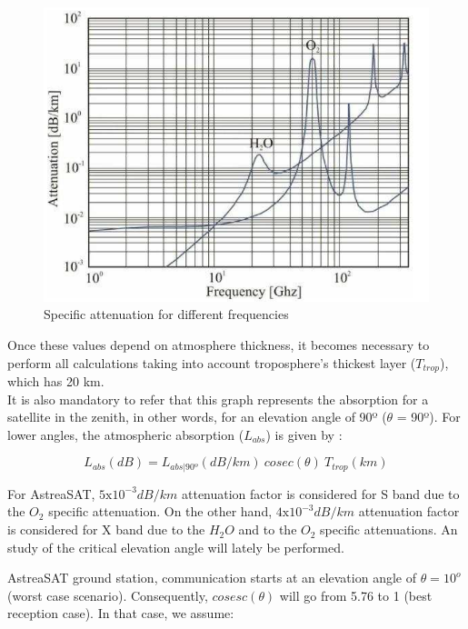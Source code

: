 \begin{figure}[H]
	\includegraphics[scale=0.7]{./sections/SatelliteDept/sections/images/specificAttenuation}
	\centering
	\caption{Specific attenuation for different frequencies \cite{Jorge2012}}
	\label{specificAtenuattion}
\end{figure}

Once these values depend on atmosphere thickness, it becomes necessary to perform all calculations taking into  account troposphere’s thickest layer ($T_{trop}$), which has 20 km.\\ It is also mandatory to refer that this graph represents the absorption for a satellite in the zenith, in other  words, for an elevation angle of 90º ($\theta$ = 90º). For lower angles, the atmospheric absorption ($L_{abs}$) is  given by \cite{Jorge2012}:

\begin{equation}
	L_{abs}(dB)=L_{abs|90º} (dB/km)\ cosec(\theta)\ T_{trop}(km)
	\label{Labs}
\end{equation}

For AstreaSAT, $5\mathrm{x}10^{-3}dB/km$ attenuation factor is considered for S band due to the $O_2$ specific attenuation. On the other hand, $4\mathrm{x}10^{-3}dB/km$ attenuation factor is considered for X band due to the $H_2O$ and to the $O_2$ specific attenuations. An study of the critical elevation angle will lately be performed. 

\For AstreaSAT ground station, communication starts at an elevation angle of $\theta=10^o$ (worst case scenario). Consequently, $cosesc(\theta)$ will go from 5.76 to 1 (best reception case). In that case, we assume:

